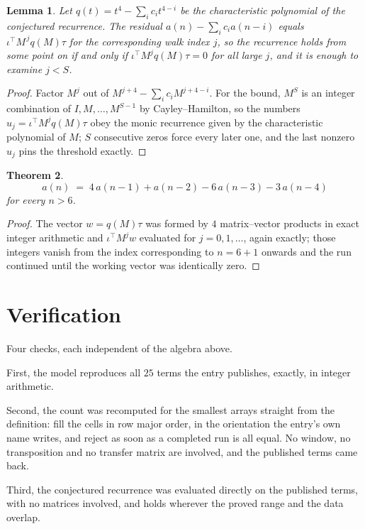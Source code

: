 \documentclass[11pt,a4paper]{article}
\theoremstyle{plain}
\newtheorem{theorem}{Theorem}
\newtheorem{lemma}[theorem]{Lemma}
\theoremstyle{definition}
\begin{document}
\begin{lemma}\label{lem:crit}
Let $q(t)=t^{4}-\sum_i c_it^{4-i}$ be the characteristic polynomial of the
conjectured recurrence. The residual $a(n)-\sum_ic_ia(n-i)$ equals
$\iota^{\!\top}M^{\,j}q(M)\tau$ for the corresponding walk index $j$, so the recurrence
holds from some point on if and only if $\iota^{\!\top}M^{j}q(M)\tau=0$ for all large $j$,
and it is enough to examine $j<S$.
\end{lemma}

\begin{proof}
Factor $M^{j}$ out of $M^{j+4}-\sum_ic_iM^{j+4-i}$. For the bound, $M^{S}$
is an integer combination of $I,M,\dots,M^{S-1}$ by Cayley--Hamilton, so the numbers
$u_j=\iota^{\!\top}M^{j}q(M)\tau$ obey the monic recurrence given by the characteristic
polynomial of $M$; $S$ consecutive zeros force every later one, and the last nonzero $u_j$
pins the threshold exactly.
\end{proof}

\begin{theorem}
\[
a(n)\;=\;4\,a(n-1) + a(n-2) - 6\,a(n-3) - 3\,a(n-4)
\]
for every $n>6$.
\end{theorem}

\begin{proof}
The vector $w=q(M)\tau$ was formed by $4$ matrix--vector products in exact integer
arithmetic and $\iota^{\!\top}M^{j}w$ evaluated for $j=0,1,\dots$, again exactly; those
integers vanish from the index corresponding to $n=6+1$ onwards and the run continued
until the working vector was identically zero.
\end{proof}

\section{Verification}

Four checks, each independent of the algebra above.

First, the model reproduces all $25$ terms the entry publishes, exactly, in integer
arithmetic.

Second, the count was recomputed for the smallest arrays straight from the definition: fill the
cells in row major order, in the orientation the entry's own name writes, and reject as soon as
a completed run is all equal. No window, no transposition and no transfer matrix are involved, and
the published terms came back.

Third, the conjectured recurrence was evaluated directly on the published terms, with no
matrices involved, and holds wherever the proved range and the data overlap.
\end{document}
